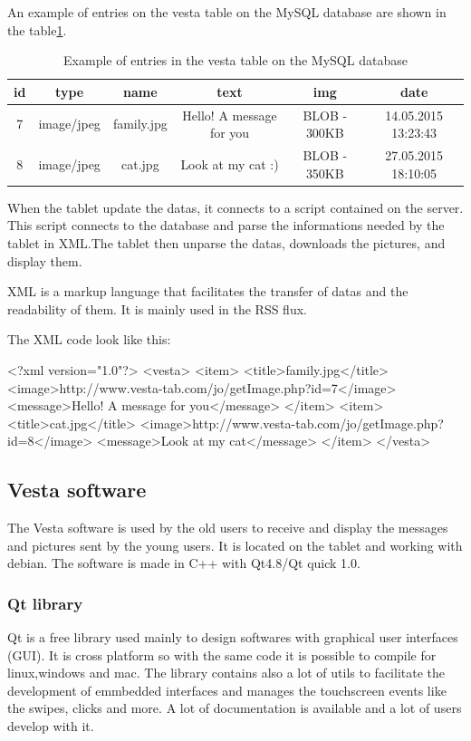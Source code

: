 An example of entries on the vesta table on the MySQL database are shown in the table\ref{tab:database}.

\begin{table}
\begin{tabular}{|c|c|c|c|c|c|}
  \hline
  id & type & name & text & img & date \\
  \hline
  7 & image/jpeg & family.jpg & Hello! A message for you & BLOB - 300KB & 14.05.2015 13:23:43 \\
  8 & image/jpeg & cat.jpg & Look at my cat :) & BLOB - 350KB & 27.05.2015 18:10:05 \\
  \hline
\end{tabular}
\caption {Example of entries in the vesta table on the MySQL database}\label{tab:database}
\end{table}

When the tablet update the datas, it connects to a script contained on the server. This script connects to the database and parse the informations needed by the tablet in XML.The tablet then unparse the datas, downloads the pictures, and display them.

XML is a markup language that facilitates the transfer of datas and the readability of them. It is mainly used in the RSS flux.





The XML code look like this:

<?xml version="1.0"?>
<vesta>
  <item>
    <title>family.jpg</title>
    <image>http://www.vesta-tab.com/jo/getImage.php?id=7</image>
    <message>Hello! A message for you</message>
  </item>
  <item>
    <title>cat.jpg</title>
    <image>http://www.vesta-tab.com/jo/getImage.php?id=8</image>
    <message>Look at my cat</message>
  </item>
</vesta>

\subsection{Vesta software}
The Vesta software is used by the old users to receive and display the messages and pictures sent by the young users. It is located on the tablet and working with debian. The software is made in C++ with Qt4.8/Qt quick 1.0.

\subsubsection{Qt library}
Qt is a free library used mainly to design softwares with graphical user interfaces (GUI). It is cross platform so with the same code it is possible to compile for linux,windows and mac.
The library contains also a lot of utils to facilitate the development of emmbedded interfaces and manages the touchscreen events like the swipes, clicks and more. A lot of documentation is available and a lot of users develop with it.

